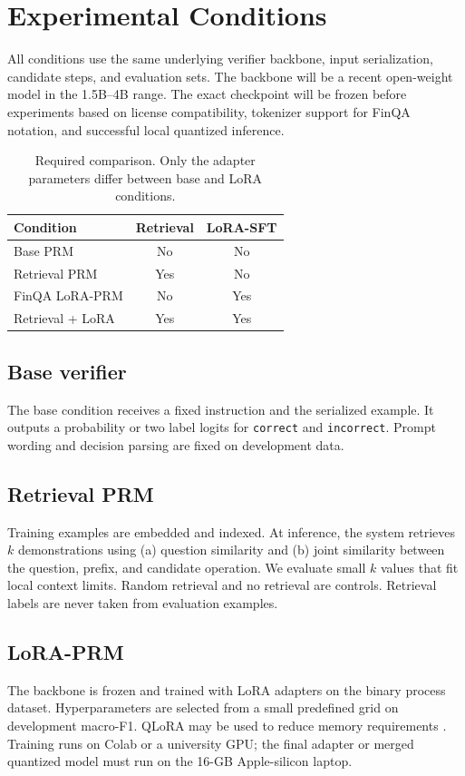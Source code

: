 \documentclass[10pt,twocolumn]{article}
\begin{document}
\section{Experimental Conditions}
All conditions use the same underlying verifier backbone, input serialization, candidate steps, and evaluation sets. The backbone will be a recent open-weight model in the 1.5B--4B range. The exact checkpoint will be frozen before experiments based on license compatibility, tokenizer support for FinQA notation, and successful local quantized inference.

\begin{table}[t]
\centering
\caption{Required comparison. Only the adapter parameters differ between base and LoRA conditions.}
\label{tab:conditions}
\small
\begin{tabular}{lcc}
\toprule
Condition & Retrieval & LoRA-SFT \\
\midrule
Base PRM & No & No \\
Retrieval PRM & Yes & No \\
FinQA LoRA-PRM & No & Yes \\
Retrieval + LoRA & Yes & Yes \\
\bottomrule
\end{tabular}
\end{table}

\subsection{Base verifier}
The base condition receives a fixed instruction and the serialized example. It outputs a probability or two label logits for \texttt{correct} and \texttt{incorrect}. Prompt wording and decision parsing are fixed on development data.

\subsection{Retrieval PRM}
Training examples are embedded and indexed. At inference, the system retrieves $k$ demonstrations using (a) question similarity and (b) joint similarity between the question, prefix, and candidate operation. We evaluate small $k$ values that fit local context limits. Random retrieval and no retrieval are controls. Retrieval labels are never taken from evaluation examples.

\subsection{LoRA-PRM}
The backbone is frozen and trained with LoRA adapters on the binary process dataset. Hyperparameters are selected from a small predefined grid on development macro-F1. QLoRA may be used to reduce memory requirements \citep{qlora2023}. Training runs on Colab or a university GPU; the final adapter or merged quantized model must run on the 16-GB Apple-silicon laptop.
\end{document}
